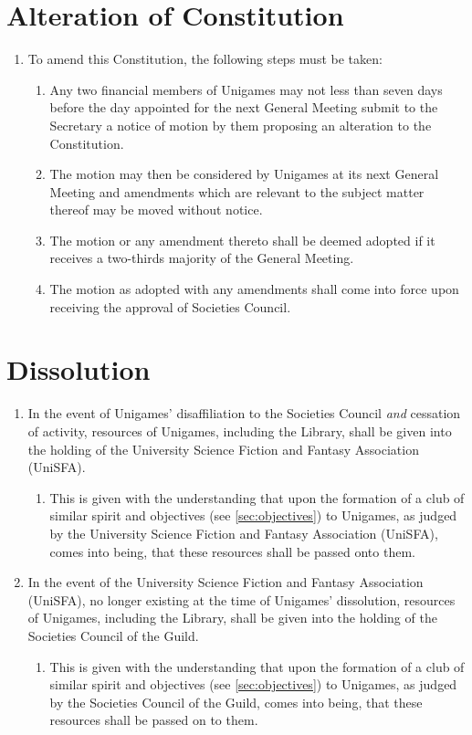 \documentclass[a4paper]{article}
\begin{document}
\section{Alteration of Constitution} \label{sec:alteration}
\begin{enumerate}
    \item To amend this Constitution, the following steps must be taken:
          \begin{enumerate}
              \item Any two financial members of Unigames may not less than seven days before the day appointed for the next General Meeting submit to the Secretary a notice of motion by them proposing an alteration to the Constitution.
              \item The motion may then be considered by Unigames at its next General Meeting and amendments which are relevant to the subject matter thereof may be moved without notice.
              \item The motion or any amendment thereto shall be deemed adopted if it receives a two-thirds majority of the General Meeting.
              \item The motion as adopted with any amendments shall come into force upon receiving the approval of Societies Council.
          \end{enumerate}
\end{enumerate}


\section{Dissolution} \label{sec:dissolution}
\begin{enumerate}
    \item In the event of Unigames' disaffiliation to the Societies Council \emph{and} cessation of activity, resources of Unigames, including the Library, shall be given into the holding of the University Science Fiction and Fantasy Association (UniSFA).
          \begin{enumerate}
              \item This is given with the understanding that upon the formation of a club of similar spirit and objectives (see \cref{sec:objectives}) to Unigames, as judged by the University Science Fiction and Fantasy Association (UniSFA), comes into being, that these resources shall be passed onto them.
          \end{enumerate}
    \item In the event of the University Science Fiction and Fantasy Association (UniSFA), no longer existing at the time of Unigames' dissolution, resources of Unigames, including the Library, shall be given into the holding of the Societies Council of the Guild.
          \begin{enumerate}
              \item This is given with the understanding that upon the formation of a club of similar spirit and objectives (see \cref{sec:objectives}) to Unigames, as judged by the Societies Council of the Guild, comes into being, that these resources shall be passed on to them.
          \end{enumerate}
\end{enumerate}
\end{document}

